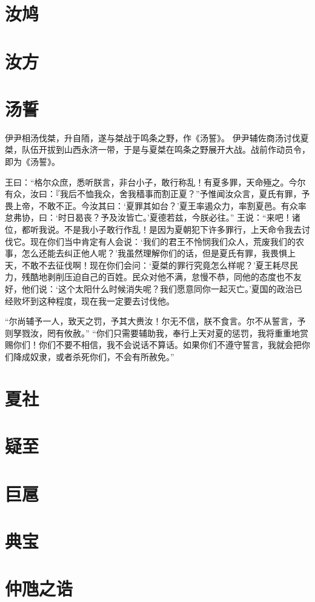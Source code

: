 \documentclass[12pt,UTF8]{ctexbook}
\begin{document}
\chapter{汝鸠}
\chapter{汝方}
\chapter{汤誓}

伊尹相汤伐桀，升自陑，遂与桀战于鸣条之野，作《汤誓》。
伊尹辅佐商汤讨伐夏桀，队伍开拔到山西永济一带，于是与夏桀在鸣条之野展开大战。战前作动员令，即为《汤誓》。

王曰：“格尔众庶，悉听朕言，非台小子，敢行称乱！有夏多罪，天命殛之。今尔有众，汝曰：『我后不恤我众，舍我穑事而割正夏？”予惟闻汝众言，夏氏有罪，予畏上帝，不敢不正。今汝其曰：‘夏罪其如台？’夏王率遏众力，率割夏邑。有众率怠弗协，曰：‘时日曷丧？予及汝皆亡。’夏德若兹，今朕必往。”
王说：“来吧！诸位，都听我说。不是我小子敢行作乱！是因为夏朝犯下许多罪行，上天命令我去讨伐它。现在你们当中肯定有人会说：‘我们的君王不怜悯我们众人，荒废我们的农事，怎么还能去纠正他人呢？’我虽然理解你们的话，但是夏氏有罪，我畏惧上天，不敢不去征伐啊！现在你们会问：‘夏桀的罪行究竟怎么样呢？’夏王耗尽民力，残酷地剥削压迫自己的百姓。民众对他不满，怠慢不恭，同他的态度也不友好，他们说：‘这个太阳什么时候消失呢？我们愿意同你一起灭亡。’夏国的政治已经败坏到这种程度，现在我一定要去讨伐他。

“尔尚辅予一人，致天之罚，予其大赉汝！尔无不信，朕不食言。尔不从誓言，予则孥戮汝，罔有攸赦。”
“你们只需要辅助我，奉行上天对夏的惩罚，我将重重地赏赐你们！你们不要不相信，我不会说话不算话。如果你们不遵守誓言，我就会把你们降成奴隶，或者杀死你们，不会有所赦免。”
\chapter{夏社}
\chapter{疑至}
\chapter{巨扈}
\chapter{典宝}

\chapter{仲虺之诰}
\end{document}
